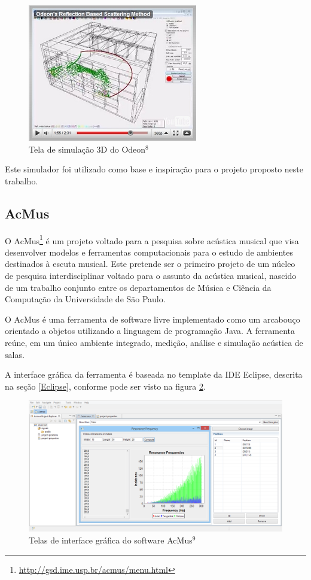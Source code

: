 \begin{figure}[!htb]
\centering
\includegraphics[scale=0.8]{figuras/odeon}
\caption{Tela de simulação 3D do Odeon$ ^{8} $}
\label{odeon}
\end{figure}

Este simulador foi utilizado como base e inspiração para o projeto proposto neste trabalho.

\subsection{AcMus}

O AcMus\footnote{\url{http://gsd.ime.usp.br/acmus/menu.html}} é um projeto voltado para a pesquisa sobre acústica musical que visa desenvolver modelos e ferramentas computacionais para o estudo de ambientes destinados à escuta musical. Este pretende ser o primeiro projeto de um núcleo de pesquisa interdisciplinar voltado para o assunto da acústica musical, nascido de um trabalho conjunto entre os departamentos de Música e Ciência da Computação da Universidade de São Paulo.

O AcMus é uma ferramenta de software livre implementado como um arcabouço orientado a objetos utilizando a linguagem de programação Java. A ferramenta reúne, em um único ambiente integrado, medição, análise e simulação acústica de salas.

A interface gráfica da ferramenta é baseada no template da IDE Eclipse, descrita na seção \ref{Eclipse}, conforme pode ser visto na figura \ref{acmus}. 

\begin{figure}[!htb]
\centering
\includegraphics[scale=0.4]{figuras/acmus}
\caption{Telas de interface gráfica do software AcMus$ ^{9} $}
\label{acmus}
\end{figure}

